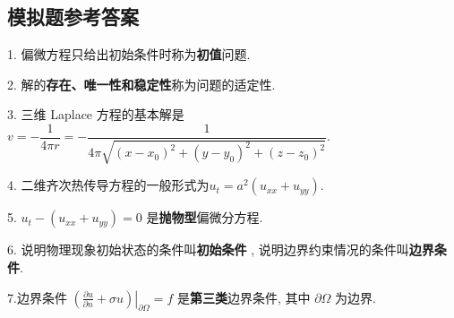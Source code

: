\subsection{模拟题参考答案}
1. 偏微方程只给出初始条件时称为\textbf{初值}问题.

2. 解的\textbf{存在、唯一性和稳定性}称为问题的适定性.

3. 三维 Laplace 方程的基本解是
$
v=-\dfrac{1}{4 \pi r}=-\dfrac{1}{4 \pi \sqrt{\left(x-x_{0}\right)^{2}+\left(y-y_{0}\right)^{2}+\left(z-z_{0}\right)^{2}}}.
$

4. 二维齐次热传导方程的一般形式为$ u_t = a^2(u_{xx} +u_{yy})$.

5. $ u_{t}-\left(u_{x x}+u_{y y}\right)=0 $ 是\textbf{抛物型}偏微分方程.

6. 说明物理现象初始状态的条件叫\textbf{初始条件} , 说明边界约束情况的条件叫\textbf{边界条件}.

7.边界条件 $ \left.\left(\frac{\partial u}{\partial n}+\sigma u\right)\right|_{\partial \Omega}=f $ 是\textbf{第三类}边界条件, 其中 $ \partial \Omega $ 为边界.

